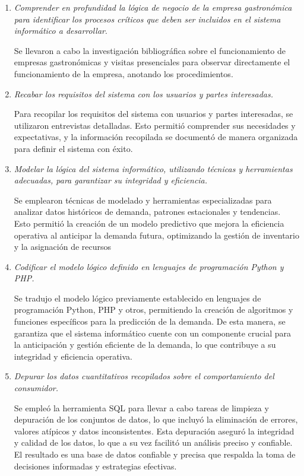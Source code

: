 \begin{enumerate}
\item  \emph{Comprender en profundidad la lógica de negocio de la empresa gastronómica para identificar los procesos críticos que deben ser incluidos en el sistema informático a desarrollar}.

Se llevaron a cabo la investigación bibliográfica sobre el funcionamiento de empresas gastronómicas y visitas presenciales para observar directamente el funcionamiento de la empresa, anotando los procedimientos.


\item  \emph{Recabar los requisitos del sistema con los usuarios y partes interesadas.}

Para recopilar los requisitos del sistema con usuarios y partes interesadas, se utilizaron entrevistas detalladas. Esto permitió comprender sus necesidades y expectativas, y la información recopilada se documentó de manera organizada para definir el sistema con éxito.

\item \emph{Modelar la lógica del sistema informático, utilizando técnicas y herramientas adecuadas, para garantizar su integridad y eficiencia.}

Se emplearon técnicas de modelado y herramientas especializadas para analizar datos históricos de demanda, patrones estacionales y tendencias. Esto permitió la creación de un modelo predictivo que mejora la eficiencia operativa al anticipar la demanda futura, optimizando la gestión de inventario y la asignación de recursos

\item  \emph{Codificar el modelo lógico definido en lenguajes de programación Python y PHP.}

Se tradujo el modelo lógico previamente establecido en lenguajes de programación Python, PHP y otros, permitiendo la creación de algoritmos y funciones específicos para la predicción de la demanda. De esta manera, se garantiza que el sistema informático cuente con un componente crucial para la anticipación y gestión eficiente de la demanda, lo que contribuye a su integridad y eficiencia operativa.

\item \emph{Depurar los datos cuantitativos recopilados sobre el comportamiento del consumidor.}

Se empleó la herramienta SQL para llevar a cabo tareas de limpieza y depuración de los conjuntos de datos, lo que incluyó la eliminación de errores, valores atípicos y datos inconsistentes. Esta depuración aseguró la integridad y calidad de los datos, lo que a su vez facilitó un análisis preciso y confiable. El resultado es una base de datos confiable y precisa que respalda la toma de decisiones informadas y estrategias efectivas.


\end{enumerate}
